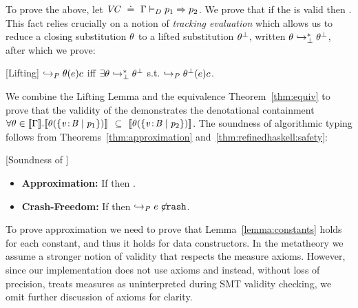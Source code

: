 To prove the above, let ${\mathit{VC} \ \doteq\  \Gamma \vdash_{D} p_1 \Rightarrow p_2}$. 
We prove that if the \VC is valid then 
.
%
This fact relies crucially on a notion of \emph{tracking evaluation} 
which allows us to reduce a closing substitution $\theta$ to a lifted substitution 
$\theta^\perp$, written $\theta \hookrightarrow_{\perp}^{*} \theta^\perp$, after which we prove:

\begin{lemma}{[Lifting]} 
$\hookrightarrow_P {\theta(e)}{c}$ iff $\exists \theta \hookrightarrow_{\perp}^{*} \theta^\perp$ s.t. $\hookrightarrow_P {\theta^\perp(e)}{c}$.
\end{lemma}

We combine the Lifting Lemma and the equivalence Theorem~\ref{thm:equiv} 
to prove that the validity of the \VC demonstrates 
the denotational containment
$\forall \theta\in [\![\Gamma]\!]. 
  		 [\![\theta(\{ {\mathit{v}\!:\!\mathit{B}} \mid \mathit{p}_1 \})]\!] 
  		$ $\subseteq$ $[\![\theta(\{ {\mathit{v}\!:\!\mathit{B}} \mid \mathit{p}_2 \})]\!]$.
%
The soundness of algorithmic typing follows from
Theorems~\ref{thm:approximation} and~\ref{thm:refinedhaskell:safety}:

\begin{theorem} {[Soundness of \declang]} 
\begin{itemize}
\item\textbf{Approximation:} If  then
  .
\item\textbf{Crash-Freedom:} If  
        then $\hookrightarrow_P {e\not}{\mathtt{crash}}$.
\end{itemize}
\end{theorem}

To prove approximation we need to prove that Lemma~\ref{lemma:constants} holds for
each constant, and thus it holds for data 
constructors.
In the metatheory we assume a stronger notion 
of validity that respects the measure axioms. 
%
However, since our implementation does not use axioms and instead, 
without loss of precision, treats measures as uninterpreted 
during SMT validity checking, we omit further discussion of axioms 
for clarity.


